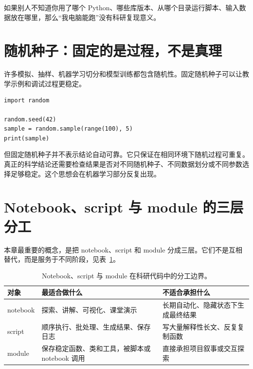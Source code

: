 \begin{warnbox}
如果别人不知道你用了哪个 Python、哪些库版本、从哪个目录运行脚本、输入数据放在哪里，那么“我电脑能跑”没有科研复现意义。
\end{warnbox}

\section{随机种子：固定的是过程，不是真理}

许多模拟、抽样、机器学习切分和模型训练都包含随机性。固定随机种子可以让教学示例和调试过程更稳定。

\begin{examplebox}[固定随机种子]
\begin{lstlisting}[style=pythonstyle]
import random

random.seed(42)
sample = random.sample(range(100), 5)
print(sample)
\end{lstlisting}
\end{examplebox}

但固定随机种子并不表示结论自动可靠。它只保证在相同环境下随机过程可重复。真正的科学结论还需要检查结果是否对不同随机种子、不同数据划分或不同参数选择足够稳定。这个思想会在机器学习部分反复出现。

\section{Notebook、script 与 module 的三层分工}

本章最重要的概念，是把 notebook、script 和 module 分成三层。它们不是互相替代，而是服务于不同阶段，见表~\ref{tab:ch04_notebook_script_module}。

\begin{table}[htbp]
\centering
\begin{tabular}{p{}p{}p{}}
\toprule
对象 & 最适合做什么 & 不适合承担什么 \\
\midrule
notebook & 探索、讲解、可视化、课堂演示 & 长期自动化、隐藏状态下生成最终结果 \\
script & 顺序执行、批处理、生成结果、保存日志 & 写大量解释性长文、反复复制函数 \\
module & 保存稳定函数、类和工具，被脚本或 notebook 调用 & 直接承担项目叙事或交互探索 \\
\bottomrule
\end{tabular}
\caption{Notebook、script 与 module 在科研代码中的分工边界。}
\label{tab:ch04_notebook_script_module}
\end{table}

